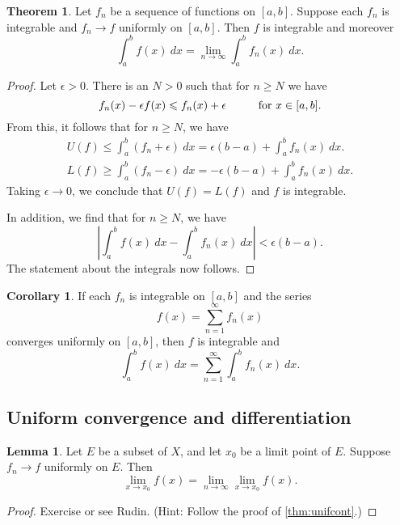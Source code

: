 \documentclass[12pt]{article}
\theoremstyle{definition}
\theoremstyle{theorem}
\newtheorem{theorem}[definition]{Theorem}
\newtheorem{corollary}[definition]{Corollary}
\newtheorem{lemma}[definition]{Lemma}
\begin{document}
\begin{theorem}
Let $f_n$ be a sequence of functions on $[a,b]$. Suppose each $f_n$ is integrable and $f_n \to f$ uniformly on $[a,b]$. Then $f$ is integrable and moreover 
\[
\int_a^b f(x) \: dx = \lim_{n \to \infty}\int_a^b f_n(x) \: dx.
\] 
\end{theorem}

\begin{proof}
Let $\epsilon > 0$. There is an $N > 0$ such that for $n \geqslant N$ we have 
\[
f_n(x) - \epsilon f(x) \leqslant f_n(x) + \epsilon \hspace{10mm} \text{for $x \in [a,b]$.}
\]
From this, it follows that for $n \geqslant N$, we have 
\begin{align*}
U(f) \leqslant \int_a^b (f_n + \epsilon) \: dx = \epsilon(b-a) + \int_a^b f_n(x) \: dx. \\
L(f) \geqslant \int_a^b (f_n - \epsilon)\: dx = -\epsilon(b-a) + \int_a^b f_n(x) \:dx.
\end{align*}
Taking $\epsilon \to 0$, we conclude that $U(f) = L(f)$ and $f$ is integrable. 

In addition, we find that for $n \geqslant N$, we have 
\[
\left|\int_a^b f(x) \: dx - \int_a^b f_n(x) \: dx \right| < \epsilon (b-a).
\]
The statement about the integrals now follows. 
\end{proof}

\begin{corollary}
If each $f_n$ is integrable on $[a,b]$ and the series 
\[
f(x) = \sum_{n=1}^\infty f_n(x)
\]
converges uniformly on $[a,b]$, then $f$ is integrable and 
\[
\int_a^b f(x) \: dx = \sum_{n=1}^\infty \int_a^b f_n(x) \: dx.
\]
\end{corollary}

\subsection{Uniform convergence and differentiation}

\begin{lemma}
Let $E$ be a subset of $X$, and let $x_0$ be a limit point of $E$. Suppose $f_n \to f$ uniformly on $E$. Then 
\[
\lim_{x \to x_0} f(x) = \lim_{n \to \infty} \lim_{x \to x_0}f(x).
\]
\end{lemma}

\begin{proof}
Exercise or see Rudin. (Hint: Follow the proof of \ref{thm:unifcont}.)
\end{proof}
\end{document}
